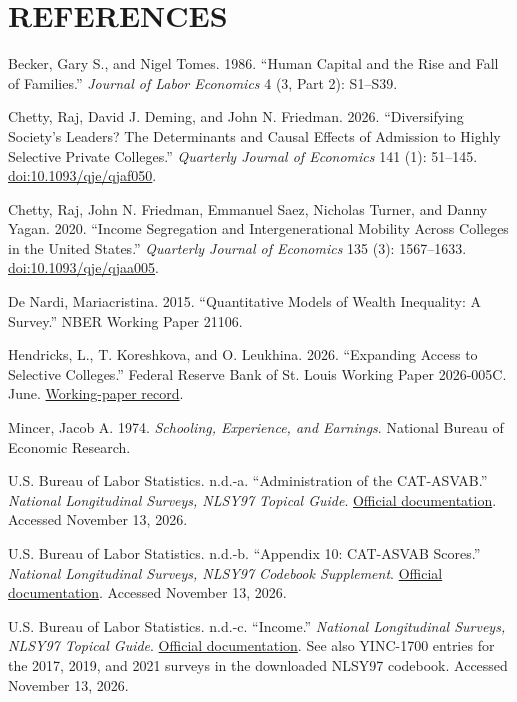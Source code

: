 \documentclass[12pt,letterpaper]{article}
\begin{document}
\section*{REFERENCES}
\begin{list}{}{\setlength{\leftmargin}{0.3in}
              \setlength{\itemindent}{-0.3in}
              \setlength{\itemsep}{0.6\baselineskip}
              \setlength{\parsep}{0pt}}
\item Becker, Gary S., and Nigel Tomes. 1986. ``Human Capital and the Rise and Fall of Families.'' \textit{Journal of Labor Economics} 4 (3, Part 2): S1--S39.
\item Chetty, Raj, David J. Deming, and John N. Friedman. 2026. ``Diversifying Society's Leaders? The Determinants and Causal Effects of Admission to Highly Selective Private Colleges.'' \textit{Quarterly Journal of Economics} 141 (1): 51--145. \href{https://doi.org/10.1093/qje/qjaf050}{doi:10.1093/qje/qjaf050}.
\item Chetty, Raj, John N. Friedman, Emmanuel Saez, Nicholas Turner, and Danny Yagan. 2020. ``Income Segregation and Intergenerational Mobility Across Colleges in the United States.'' \textit{Quarterly Journal of Economics} 135 (3): 1567--1633. \href{https://doi.org/10.1093/qje/qjaa005}{doi:10.1093/qje/qjaa005}.
\item De Nardi, Mariacristina. 2015. ``Quantitative Models of Wealth Inequality: A Survey.'' NBER Working Paper 21106.
\item Hendricks, L., T. Koreshkova, and O. Leukhina. 2026. ``Expanding Access to Selective Colleges.'' Federal Reserve Bank of St. Louis Working Paper 2026-005C. June. \href{https://fedinprint.org/item/fedlwp/102965/103406}{Working-paper record}.
\item Mincer, Jacob A. 1974. \textit{Schooling, Experience, and Earnings}. National Bureau of Economic Research.
\item U.S. Bureau of Labor Statistics. n.d.-a. ``Administration of the CAT-ASVAB.'' \textit{National Longitudinal Surveys, NLSY97 Topical Guide}. \href{https://nlsinfo.org/content/cohorts/nlsy97/topical-guide/education/administration-cat-asvab-0}{Official documentation}. Accessed November 13, 2026.
\item U.S. Bureau of Labor Statistics. n.d.-b. ``Appendix 10: CAT-ASVAB Scores.'' \textit{National Longitudinal Surveys, NLSY97 Codebook Supplement}. \href{https://nlsinfo.org/content/cohorts/nlsy97/other-documentation/codebook-supplement/appendix-10-cat-asvab-scores}{Official documentation}. Accessed November 13, 2026.
\item U.S. Bureau of Labor Statistics. n.d.-c. ``Income.'' \textit{National Longitudinal Surveys, NLSY97 Topical Guide}. \href{https://nlsinfo.org/content/cohorts/nlsy97/topical-guide/income/income}{Official documentation}. See also YINC-1700 entries for the 2017, 2019, and 2021 surveys in the downloaded NLSY97 codebook. Accessed November 13, 2026.
\end{list}
\end{document}
